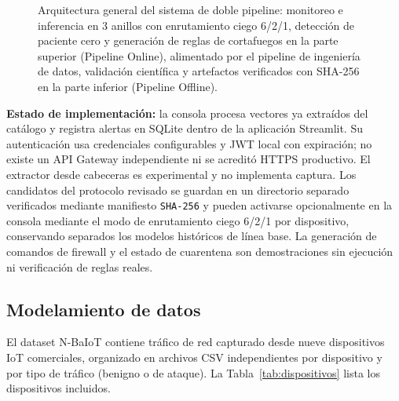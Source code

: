 \documentclass[11pt,a4paper]{article}
\begin{document}
\begin{figure}[H]
{
}%
\caption{Arquitectura general del sistema de doble pipeline: monitoreo e inferencia en 3 anillos con enrutamiento ciego 6/2/1, detección de paciente cero y generación de reglas de cortafuegos en la parte superior (Pipeline Online), alimentado por el pipeline de ingeniería de datos, validación científica y artefactos verificados con SHA-256 en la parte inferior (Pipeline Offline).}
\label{fig:arquitectura}
\end{figure}

\textbf{Estado de implementación:} la consola procesa vectores ya extraídos del catálogo y registra alertas en SQLite dentro de la aplicación Streamlit. Su autenticación usa credenciales configurables y JWT local con expiración; no existe un API Gateway independiente ni se acreditó HTTPS productivo. El extractor desde cabeceras es experimental y no implementa captura. Los candidatos del protocolo revisado se guardan en un directorio separado verificados mediante manifiesto \texttt{SHA-256} y pueden activarse opcionalmente en la consola mediante el modo de enrutamiento ciego 6/2/1 por dispositivo, conservando separados los modelos históricos de línea base. La generación de comandos de firewall y el estado de cuarentena son demostraciones sin ejecución ni verificación de reglas reales.

\subsection{Modelamiento de datos}
El dataset N-BaIoT contiene tráfico de red capturado desde nueve dispositivos IoT comerciales, organizado en archivos CSV independientes por dispositivo y por tipo de tráfico (benigno o de ataque). La Tabla~\ref{tab:dispositivos} lista los dispositivos incluidos.
\end{document}
